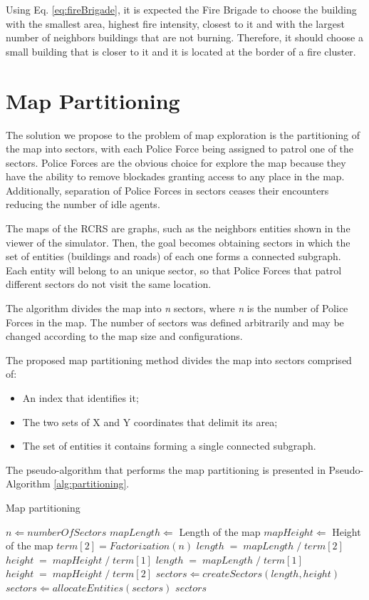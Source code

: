 \documentclass{llncs}
\begin{document}
Using Eq. \ref{eq:fireBrigade}, it is expected the Fire Brigade to choose the building with the smallest area, highest fire intensity, closest to it and with the largest number of neighbors buildings that are not burning. Therefore, it should choose a small building that is closer to it and it is located at the border of a fire cluster.
\section{Map Partitioning}
\label{sec:partitioning}
The solution we propose to the problem of map exploration is the partitioning of the map into sectors, with each Police Force being assigned to patrol one of the sectors. Police Forces are the obvious choice for explore the map because they have the ability to remove blockades granting access to any place in the map. Additionally, separation of Police Forces in sectors ceases their encounters reducing the number of idle agents.

The maps of the RCRS are graphs, such as the neighbors entities shown in the viewer of the simulator. Then, the goal becomes obtaining sectors in which the set of entities (buildings and roads) of each one forms a connected subgraph. Each entity will belong to an unique sector, so that Police Forces that patrol different sectors do not visit the same location.

The algorithm divides the map into {\it n} sectors, where {\it n} is the number of Police Forces in the map. The number of sectors was defined arbitrarily and may be changed according to the map size and configurations.

The proposed map partitioning method divides the map into sectors comprised of:
\begin{itemize}
\item An index that identifies it;
\item The two sets of X and Y coordinates that delimit its area;
\item The set of entities it contains forming a single connected subgraph.
\end{itemize}

The pseudo-algorithm that performs the map partitioning is presented in Pseudo-Algorithm \ref{alg:partitioning}.
\begin{algorithm}
  \caption{Map partitioning}
  \label{alg:partitioning}
  \begin{algorithmic}
    \REQUIRE $n \Leftarrow numberOfSectors$
    \STATE
    \STATE $mapLength \Leftarrow$ Length of the map
    \STATE $mapHeight \Leftarrow$ Height of the map
    \STATE $term[2] = Factorization(n)$ 
      \STATE $length\;=\;mapLength\;/\;term[2]$
      \STATE $height\;=\;mapHeight\;/\;term[1]$
    \ELSE
      \STATE $length\;=\;mapLength\;/\;term[1]$
      \STATE $height\;=\;mapHeight\;/\;term[2]$
    \ENDIF
    \STATE $sectors \Leftarrow createSectors(length, height)$
    \STATE $sectors \Leftarrow allocateEntities(sectors)$
    \RETURN $sectors$
  \end{algorithmic}
\end{algorithm}
\end{document}
